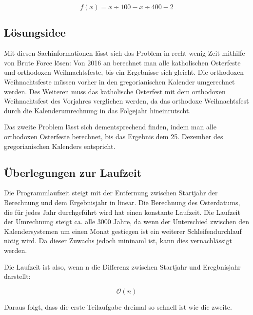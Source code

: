 	\[f(x)=x\div{}100-x\div{}400-2\]

\clearpage
\subsection {Lösungsidee}
	Mit diesen Sachinformationen lässt sich das Problem in recht wenig Zeit mithilfe von Brute Force lösen: Von 2016 an berechnet man alle katholischen Osterfeste und orthodoxen Weihnachtsfeste, bis ein Ergebnisse sich gleicht. Die orthodoxen Weihnachtsfeste müssen vorher in den gregorianischen Kalender umgerechnet werden. Des Weiteren muss das katholische Osterfest mit dem orthodoxen Weihnachtsfest des Vorjahres verglichen werden, da das orthodoxe Weihnachtsfest  durch die Kalenderumrechnung in das Folgejahr hineinrutscht.

	Das zweite Problem lässt sich dementsprechend finden, indem man alle orthodoxen Osterfeste berechnet, bis das Ergebnis dem 25. Dezember des gregorianischen Kalenders entspricht.

\subsection {Überlegungen zur Laufzeit}
Die Programmlaufzeit steigt mit der Entfernung zwischen Startjahr der Berechnung und dem Ergebnisjahr in linear. Die Berechnung des Osterdatums, die für jedes Jahr durchgeführt wird hat einen konstante Laufzeit. Die Laufzeit der Umrechnung steigt ca. alle 3000 Jahre, da wenn der Unterschied zwischen den Kalendersystemen um einen Monat gestiegen ist ein weiterer Schleifendurchlauf nötig wird. Da dieser Zuwachs jedoch mininaml ist, kann dies vernachlässigt werden.

Die Laufzeit ist also, wenn n die Differenz zwischen Startjahr und Eregbnisjahr darstellt:

\[\mathcal O(n)\]

Daraus folgt, dass die erste Teilaufgabe dreimal so schnell ist wie die zweite.